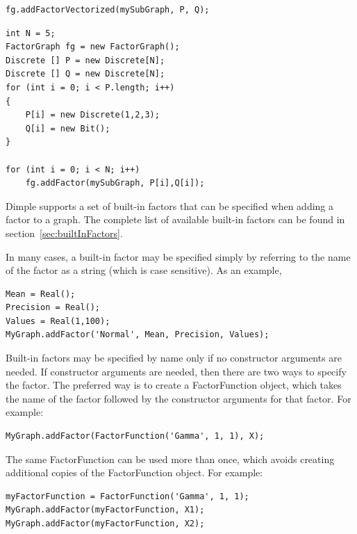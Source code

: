 \begin{lstlisting}
fg.addFactorVectorized(mySubGraph, P, Q);
\end{lstlisting}

\fi

\ifjava
\begin{lstlisting}
int N = 5;
FactorGraph fg = new FactorGraph();
Discrete [] P = new Discrete[N];
Discrete [] Q = new Discrete[N];
for (int i = 0; i < P.length; i++)
{
	P[i] = new Discrete(1,2,3);
	Q[i] = new Bit();
}

for (int i = 0; i < N; i++)
    fg.addFactor(mySubGraph, P[i],Q[i]);

\end{lstlisting}
\fi


\label{sec:usingBuiltInFactors}

Dimple supports a set of built-in factors that can be specified when adding a factor to a graph.  The complete list of available built-in factors can be found in section~\ref{sec:builtInFactors}.

\ifmatlab

In many cases, a built-in factor may be specified simply by referring to the name of the factor as a string (which is case sensitive).  As an example,

\begin{lstlisting}
Mean = Real();
Precision = Real();
Values = Real(1,100);
MyGraph.addFactor('Normal', Mean, Precision, Values);
\end{lstlisting}


Built-in factors may be specified by name only if no constructor arguments are needed.  If constructor arguments are needed, then there are two ways to specify the factor.  The preferred way is to create a FactorFunction object, which takes the name of the factor followed by the constructor arguments for that factor.  For example:

\begin{lstlisting}
MyGraph.addFactor(FactorFunction('Gamma', 1, 1), X);
\end{lstlisting}

The same FactorFunction can be used more than once, which avoids creating additional copies of the FactorFunction object.  For example:

\begin{lstlisting}
myFactorFunction = FactorFunction('Gamma', 1, 1);
MyGraph.addFactor(myFactorFunction, X1);
MyGraph.addFactor(myFactorFunction, X2);
\end{lstlisting}

